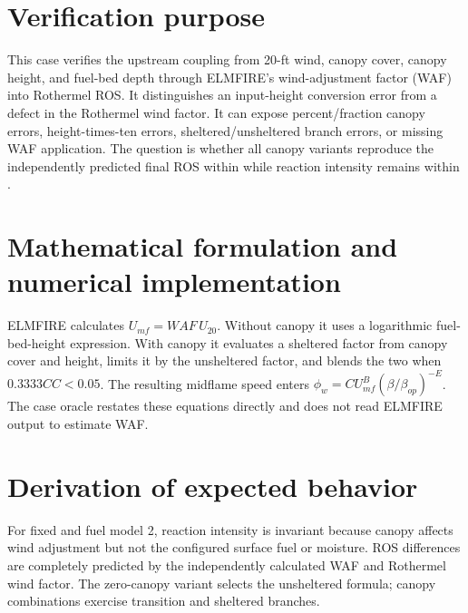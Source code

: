 \section{Verification purpose}
This case verifies the upstream coupling from 20-ft wind, canopy cover, canopy height, and fuel-bed depth through ELMFIRE's wind-adjustment factor (WAF) into Rothermel ROS.  It distinguishes an input-height conversion error from a defect in the Rothermel wind factor.  It can expose percent/fraction canopy errors, height-times-ten errors, sheltered/unsheltered branch errors, or missing WAF application.  The question is whether all canopy variants reproduce the independently predicted final ROS within \RosTolerance{} while reaction intensity remains within \IrTolerance{}.

\section{Mathematical formulation and numerical implementation}
ELMFIRE calculates $U_{mf}=WAF\,U_{20}$.  Without canopy it uses a logarithmic fuel-bed-height expression.  With canopy it evaluates a sheltered factor from canopy cover and height, limits it by the unsheltered factor, and blends the two when $0.3333CC<0.05$.  The resulting midflame speed enters $\phi_w=C U_{mf}^{B}(\beta/\beta_{op})^{-E}$.  The case oracle restates these equations directly and does not read ELMFIRE output to estimate WAF.

\section{Derivation of expected behavior}
For fixed \WindTwenty{} and fuel model 2, reaction intensity is invariant because canopy affects wind adjustment but not the configured surface fuel or moisture.  ROS differences are completely predicted by the independently calculated WAF and Rothermel wind factor.  The zero-canopy variant selects the unsheltered formula; canopy combinations exercise transition and sheltered branches.

